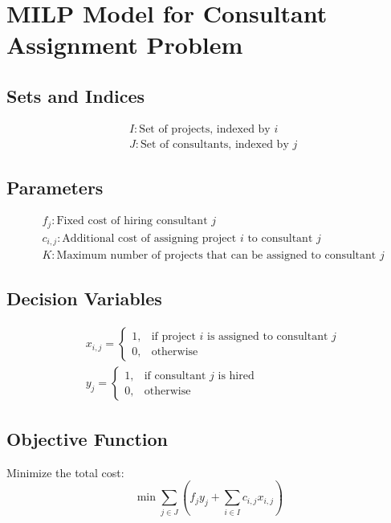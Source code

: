 \documentclass{article}
\begin{document}
\section*{MILP Model for Consultant Assignment Problem}

\subsection*{Sets and Indices}
\begin{align*}
    & I : \text{Set of projects, indexed by } i \\
    & J : \text{Set of consultants, indexed by } j
\end{align*}

\subsection*{Parameters}
\begin{align*}
    & f_j : \text{Fixed cost of hiring consultant } j \\
    & c_{i,j} : \text{Additional cost of assigning project } i \text{ to consultant } j \\
    & K : \text{Maximum number of projects that can be assigned to consultant } j
\end{align*}

\subsection*{Decision Variables}
\begin{align*}
    & x_{i,j} = 
    \begin{cases} 
    1, & \text{if project } i \text{ is assigned to consultant } j \\
    0, & \text{otherwise}
    \end{cases} \\
    & y_j = 
    \begin{cases} 
    1, & \text{if consultant } j \text{ is hired} \\
    0, & \text{otherwise}
    \end{cases} 
\end{align*}

\subsection*{Objective Function}
Minimize the total cost:
\begin{equation}
    \min \sum_{j \in J} \left( f_j y_j + \sum_{i \in I} c_{i,j} x_{i,j} \right)
\end{equation}
\end{document}

